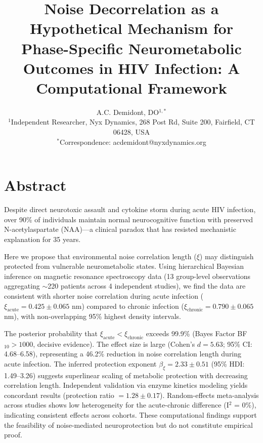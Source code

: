 \documentclass[10pt,a4paper]{article}
\makeatletter
\renewcommand{\maketitle}{
  \begin{center}
    {\LARGE\bfseries\@title\par}
    \vspace{1em}
    {\large\@author\par}
    \vspace{0.5em}
    {\small\@date\par}
  \end{center}
  \vspace{1em}
}
\makeatother
\begin{document}
\title{Noise Decorrelation as a Hypothetical Mechanism for Phase-Specific Neurometabolic Outcomes in HIV Infection: A Computational Framework}

\author{
A.C. Demidont, DO$^{1,*}$\\[0.5em]
{\small $^1$Independent Researcher, Nyx Dynamics, 268 Post Rd, Suite 200, Fairfield, CT 06428, USA}\\
{\small $^*$Correspondence: acdemidont@nyxdynamics.org}
}

\date{}

\maketitle

\section*{Abstract}

Despite direct neurotoxic assault and cytokine storm during acute HIV infection, over 90\% of individuals maintain normal neurocognitive function with preserved N-acetylaspartate (NAA)---a clinical paradox that has resisted mechanistic explanation for 35 years.

Here we propose that environmental noise correlation length ($\xi$) may distinguish protected from vulnerable neurometabolic states. Using hierarchical Bayesian inference on magnetic resonance spectroscopy data (13 group-level observations aggregating $\sim$220 patients across 4 independent studies), we find the data are consistent with shorter noise correlation during acute infection ($\xi_{\text{acute}} = 0.425 \pm 0.065$ nm) compared to chronic infection ($\xi_{\text{chronic}} = 0.790 \pm 0.065$ nm), with non-overlapping 95\% highest density intervals.

The posterior probability that $\xi_{\text{acute}} < \xi_{\text{chronic}}$ exceeds 99.9\% (Bayes Factor BF$_{10} > 1000$, decisive evidence). The effect size is large (Cohen's $d = 5.63$; 95\% CI: 4.68--6.58), representing a 46.2\% reduction in noise correlation length during acute infection. The inferred protection exponent $\beta_\xi = 2.33 \pm 0.51$ (95\% HDI: 1.49--3.26) suggests superlinear scaling of metabolic protection with decreasing correlation length. Independent validation via enzyme kinetics modeling yields concordant results (protection ratio $= 1.28 \pm 0.17$). Random-effects meta-analysis across studies shows low heterogeneity for the acute-chronic difference (I$^2$ = 0\%), indicating consistent effects across cohorts. These computational findings support the feasibility of noise-mediated neuroprotection but do not constitute empirical proof.
\end{document}
